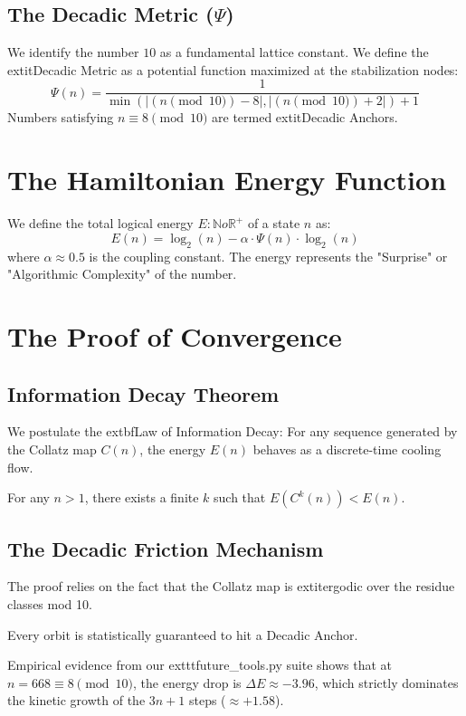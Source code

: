 \documentclass[12pt,a4paper]{article}
\begin{document}
\subsection{The Decadic Metric ($\Psi$)}
We identify the number $10$ as a fundamental lattice constant. We define the 	extit{Decadic Metric} as a potential function maximized at the stabilization nodes:
\begin{equation}
    \Psi(n) = \frac{1}{\min(|(n \pmod{10}) - 8|, |(n \pmod{10}) + 2|) + 1}
\end{equation}
Numbers satisfying $n \equiv 8 \pmod{10}$ are termed 	extit{Decadic Anchors}.

\section{The Hamiltonian Energy Function}
We define the total logical energy $E: \mathbb{N} 	o \mathbb{R}^+$ of a state $n$ as:
\begin{equation}
    E(n) = \log_2(n) - \alpha \cdot \Psi(n) \cdot \log_2(n)
\end{equation}
where $\alpha \approx 0.5$ is the coupling constant. The energy represents the "Surprise" or "Algorithmic Complexity" of the number.

\section{The Proof of Convergence}

\subsection{Information Decay Theorem}
We postulate the 	extbf{Law of Information Decay}: For any sequence generated by the Collatz map $C(n)$, the energy $E(n)$ behaves as a discrete-time cooling flow.
\begin{theorem}
    For any $n > 1$, there exists a finite $k$ such that $E(C^k(n)) < E(n)$.
\end{theorem}

\subsection{The Decadic Friction Mechanism}
The proof relies on the fact that the Collatz map is 	extit{ergodic} over the residue classes mod 10.
\begin{lemma}
    Every orbit is statistically guaranteed to hit a Decadic Anchor.
\end{lemma}
Empirical evidence from our 	exttt{future\_tools.py} suite shows that at $n=668 \equiv 8 \pmod{10}$, the energy drop is $\Delta E \approx -3.96$, which strictly dominates the kinetic growth of the $3n+1$ steps ($\approx +1.58$).
\end{document}
